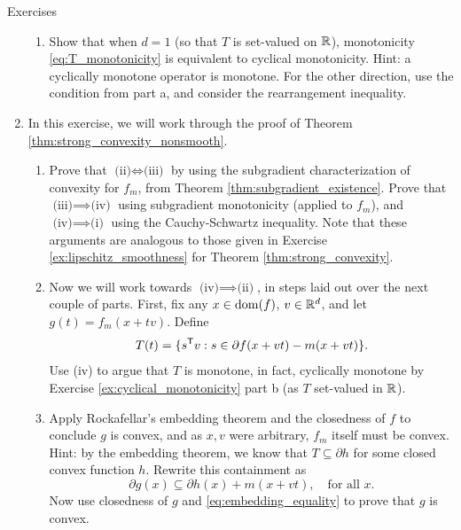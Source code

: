 \begin{xcb}{Exercises}
\begin{enumerate}[label=\thechapter.\arabic*]
\begin{enumerate}[label=\alph*.]
\item Show that when $d=1$ (so that $T$ is set-valued on $\mathbb{R}$), 
  monotonicity \eqref{eq:T_monotonicity} is equivalent to cyclical
  monotonicity. Hint: a cyclically monotone operator is monotone. For the other
  direction, use the condition from part a, and consider the rearrangement
  inequality.        

\end{enumerate}

\item \label{ex:strong_convexity_nonsmooth}
  In this exercise, we will work through the proof of Theorem
  \ref{thm:strong_convexity_nonsmooth}. 

\begin{enumerate}[label=\alph*.]
\item Prove that $\text{(ii)} \iff \text{(iii)}$ by using the subgradient
  characterization of convexity for $f_m$, from Theorem
  \ref{thm:subgradient_existence}. Prove that $\text{(iii)} \implies
  \text{(iv)}$ using subgradient monotonicity (applied to $f_m$), and
  $\text{(iv)} \implies \text{(i)}$ using the Cauchy-Schwartz inequality. Note
  that these arguments are analogous to those given in Exercise 
  \ref{ex:lipschitz_smoothness} for Theorem \ref{thm:strong_convexity}.   
  
\item Now we will work towards $\text{(iv)} \implies \text{(ii)}$, in steps laid
  out over the next couple of parts. First, fix any $x \in \operatorname{dom}(f)$, $v \in
  \mathbb{R}^d$, and let $g(t) = f_m(x + tv)$. Define 
  \[
  T(t) = \{ s^{\mathsf{T}} v : s \in \partial f(x+vt) - m(x+vt) \}.
  \]
  Use (iv) to argue that $T$ is monotone, in fact, cyclically monotone by
  Exercise \ref{ex:cyclical_monotonicity} part b (as $T$ set-valued in $\mathbb{R}$). 

\item Apply Rockafellar's embedding theorem and the closedness of $f$ to
  conclude $g$ is convex, and as $x,v$ were arbitrary, $f_m$ itself must be
  convex. Hint: by the embedding theorem, we know that $T \subseteq \partial h$
  for some closed convex function $h$. Rewrite this containment as 
  \[
  \partial g(x) \subseteq \partial h(x) + m(x+vt), \quad \text{for all $x$}.
  \]
  Now use closedness of $g$ and \eqref{eq:embedding_equality} to prove that $g$
  is convex. 
\end{enumerate}


\end{enumerate}
\end{xcb}
